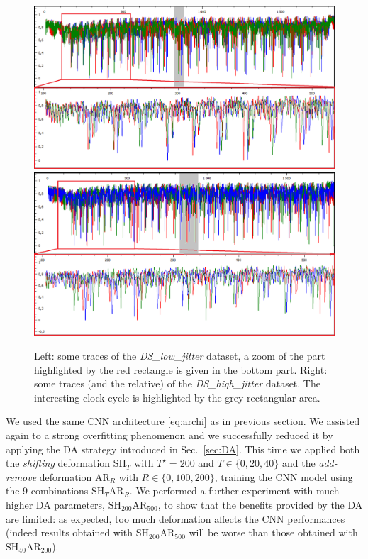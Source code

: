 \begin{figure}
\includegraphics[width=.5\textwidth]{../Figures/CHES2017/jitter_2_2_framed.png} 
\includegraphics[width=.5\textwidth]{../Figures/CHES2017/jitter_6_6_framed.png} 
\caption{Left: some traces of the \emph{DS\_low\_jitter} dataset, a zoom of the part highlighted by the red rectangle is given in the bottom part. Right: some traces (and the relative) of the \emph{DS\_high\_jitter} dataset. The interesting clock cycle is highlighted by the grey rectangular area.}\label{fig:jitter_traces}
\end{figure}

We used the same CNN architecture \eqref{eq:archi} as in previous section. We assisted again to a strong overfitting phenomenon and we successfully reduced it by applying the DA strategy introduced in Sec.~\ref{sec:DA}. This time we applied both the \emph{shifting} deformation $\mathrm{SH}_T$ with $T^\star = 200$ and $T\in\{0,20,40\}$ and the \emph{add-remove} deformation $\mathrm{AR}_R$ with $R\in \{0,100,200\}$, training the CNN model using the 9 combinations $\mathrm{SH}_T\mathrm{AR}_R$. We performed a further experiment with much higher DA parameters, \ie $\mathrm{SH}_{200}\mathrm{AR}_{500}$, to show that the benefits provided by the DA are limited: as expected, too much deformation affects the CNN performances (indeed results obtained with $\mathrm{SH}_{200}\mathrm{AR}_{500}$ will be worse than those obtained with \eg $\mathrm{SH}_{40}\mathrm{AR}_{200}$).

